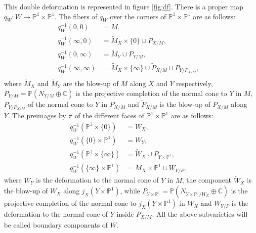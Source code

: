 \documentclass[10pt,twoside]{article}
\numberwithin{equation}{section}
\theoremstyle{plain}
\theoremstyle{definition}
\begin{document}
This double deformation is represented in figure \ref{fig:df}. There
is a proper map $q_{W}\colon W\longrightarrow \mathbb{P}^{1}\times
\mathbb{P}^{1}$. The fibers of $q_{W}$ over the corners of $\mathbb{P}^{1}\times
\mathbb{P}^{1}$ are as follows:
\begin{align*}
  q_{W} ^{-1}(0,0)&=M,\\
  q_{W} ^{-1}(\infty,0)&=\widetilde M_{X}\times \{0\} \cup P_{X/M},\\
  q_{W} ^{-1}(0,\infty)&=\widetilde M_{Y} \cup P_{Y/M},\\
  q_{W} ^{-1}(\infty,\infty)&=\widetilde M_{X} \times \{\infty\} \cup
  \widetilde 
  P_{X/M}\cup P_{Y/P_{X/M}},\\
\end{align*}
where $\widetilde M_{X}$ and $\widetilde M_{Y}$ are the blow-up of $M$
along $X$ and $Y$ respectively,
$P_{Y/M}=\mathbb{P}(N_{Y/M}\oplus \mathbb{C})$ is the projective completion of
the 
normal cone to $Y$ in $M$, $P_{Y/P_{X/M}}$ of the normal cone to
 $Y$ in $P_{X/M}$ and $\widetilde 
  P_{X/M}$ is the blow-up of $P_{X/M}$ along $Y$. 
The preimages by $\pi$ of the different faces of
$\mathbb{P}^{1}\times 
\mathbb{P}^{1}$  are as follows:
\begin{align*}
  q_{W} ^{-1}(\mathbb{P}^{1}\times \{0\})&= W_{X},\\
  q_{W} ^{-1}(\{0\}\times \mathbb{P}^{1})&= W_{Y},\\
  q_{W} ^{-1}(\mathbb{P}^{1}\times \{\infty\})&= \widetilde W_{X}\cup
  P_{Y\times \mathbb{P}^{1}},\\
  q_{W} ^{-1}(\{\infty\}\times \mathbb{P}^{1})&= \widetilde M_{X}\times
  \mathbb{P}^{1}\cup W_{Y/P},
\end{align*}
where $W_{Y}$ is the deformation to the normal cone of $Y$ in $M$,
the component $\widetilde W_{X}$ is the blow-up of $W_{X}$ along $j_{X}(Y\times
\mathbb{P}^{1})$, while 
$ P_{Y\times \mathbb{P}^{1}}=\mathbb{P}(N_{Y\times
    \mathbb{P}^{1}/W_{X}}\oplus \mathbb{C})$ is the
  projective completion of the normal cone to $j_{X}(Y\times 
\mathbb{P}^{1})$ in $W_{X}$ and $W_{Y/P} $ is the deformation to the
normal cone of $Y$ inside $P_{X/M}$. All the above subvarieties will
be called boundary components of $W$. 
\end{document}
